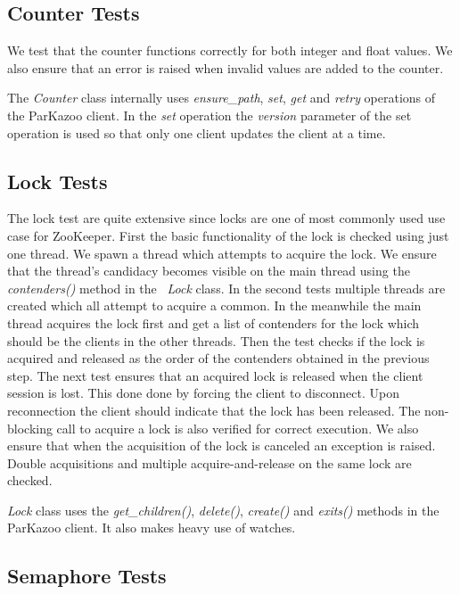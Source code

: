 \subsection{Counter Tests}

We test that the counter functions correctly for both integer and float values. We also ensure that an error is raised when invalid values are added to the counter.

The \textit{Counter} class internally uses \textit{ensure\_path}, \textit{set}, \textit{get} and \textit{retry} operations of the ParKazoo client. In the \textit{set} operation the \textit{version} parameter of the set operation is used so that only one client updates the client at a time.

\subsection{Lock Tests}
The lock test are quite extensive since locks are one of most commonly used use case for ZooKeeper. First the basic functionality of the lock is checked using just one thread. We spawn a thread which attempts to acquire the lock. We ensure that the thread's candidacy becomes visible on the main thread using the \textit{contenders()} method in the ~\textit{Lock} class. In the second tests multiple threads are created which all attempt to acquire a common. In the meanwhile the main thread acquires the lock first and get a list of contenders for the lock which should be the clients in the other threads. Then the test checks if the lock is acquired and released as the order of the contenders obtained in the previous step. The next test ensures that an acquired lock is released when the client session is lost. This done done by forcing the client to disconnect. Upon reconnection the client should indicate that the lock has been released. The non-blocking call to acquire a lock is also verified for correct execution. We also ensure that when the acquisition of the lock is canceled an exception is raised. Double acquisitions and multiple acquire-and-release on the same lock are checked.

\textit{Lock} class uses the \textit{get\_children()}, \textit{delete()}, \textit{create()} and \textit{exits()} methods in the ParKazoo client. It also makes heavy use of watches.

\subsection{Semaphore Tests}

